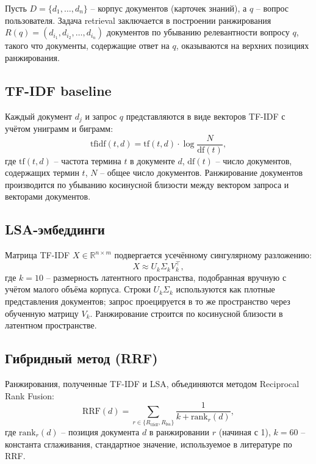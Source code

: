 \documentclass[11pt]{article}
\begin{document}
Пусть $D = \{d_1, \dots, d_n\}$ -- корпус документов (карточек знаний), а
$q$ -- вопрос пользователя. Задача retrieval заключается в построении
ранжирования $R(q) = (d_{i_1}, d_{i_2}, \dots, d_{i_n})$ документов по
убыванию релевантности вопросу $q$, такого что документы, содержащие
ответ на $q$, оказываются на верхних позициях ранжирования.

\subsection{TF-IDF baseline}

Каждый документ $d_j$ и запрос $q$ представляются в виде векторов TF-IDF
с учётом униграмм и биграмм:
\begin{equation}
\text{tfidf}(t, d) = \text{tf}(t, d) \cdot \log\frac{N}{\text{df}(t)},
\end{equation}
где $\text{tf}(t, d)$ -- частота термина $t$ в документе $d$, $\text{df}(t)$ --
число документов, содержащих термин $t$, $N$ -- общее число документов.
Ранжирование документов производится по убыванию косинусной близости между
вектором запроса и векторами документов.

\subsection{LSA-эмбеддинги}

Матрица TF-IDF $X \in \mathbb{R}^{n \times m}$ подвергается усечённому
сингулярному разложению:
\begin{equation}
X \approx U_k \Sigma_k V_k^\top,
\end{equation}
где $k=10$ -- размерность латентного пространства, подобранная вручную с
учётом малого объёма корпуса. Строки $U_k \Sigma_k$ используются как плотные
представления документов; запрос проецируется в то же пространство через
обученную матрицу $V_k$. Ранжирование строится по косинусной близости в
латентном пространстве.

\subsection{Гибридный метод (RRF)}

Ранжирования, полученные TF-IDF и LSA, объединяются методом Reciprocal
Rank Fusion:
\begin{equation}
\text{RRF}(d) = \sum_{r \in \{R_{\text{tfidf}}, R_{\text{lsa}}\}} \frac{1}{k + \text{rank}_r(d)},
\end{equation}
где $\text{rank}_r(d)$ -- позиция документа $d$ в ранжировании $r$ (начиная
с 1), $k=60$ -- константа сглаживания, стандартное значение, используемое в
литературе по RRF.
\end{document}
